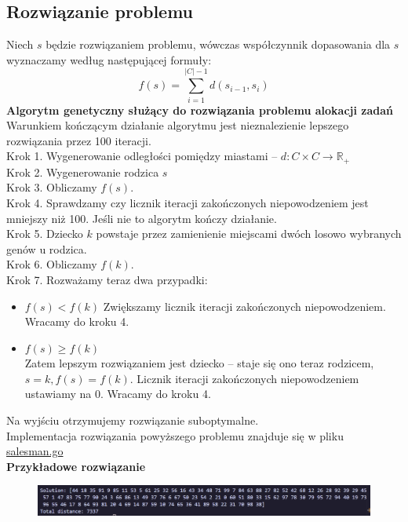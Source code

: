 \documentclass{article}
\begin{document}
    \subsection{Rozwiązanie problemu}
    Niech $s$ będzie rozwiązaniem problemu, wówczas współczynnik dopasowania dla $s$ wyznaczamy według następującej formuły:
    $$f(s)=\sum_{i=1}^{|C|-1}d(s_{i-1},s_i)$$
    \textbf{Algorytm genetyczny służący do rozwiązania problemu alokacji zadań}\\
    Warunkiem kończącym działanie algorytmu jest nieznalezienie lepszego rozwiązania przez 100 iteracji.\\
    Krok 1. Wygenerowanie odległości pomiędzy miastami -- $d:C\times C\rightarrow \mathbb{R_+}$\\
    Krok 2. Wygenerowanie rodzica $s$\\
    Krok 3. Obliczamy $f(s)$.\\
    Krok 4. Sprawdzamy czy licznik iteracji zakończonych niepowodzeniem jest mniejszy niż 100. Jeśli nie to algorytm kończy działanie.\\
    Krok 5. Dziecko $k$ powstaje przez zamienienie miejscami dwóch losowo wybranych genów u rodzica.\\
    Krok 6. Obliczamy $f(k)$.\\
    Krok 7. Rozważamy teraz dwa przypadki:
    \begin{itemize}
    \item $f(s) < f(k)$
        Zwiększamy licznik iteracji zakończonych niepowodzeniem. Wracamy do kroku 4.
    \item $f(s)\geq f(k)$\\
        Zatem lepszym rozwiązaniem jest dziecko -- staje się ono teraz rodzicem, $s=k, f(s)=f(k)$. Licznik iteracji zakończonych niepowodzeniem ustawiamy na 0. Wracamy do kroku 4.
    \end{itemize}
    Na wyjściu otrzymujemy rozwiązanie suboptymalne.\\
    Implementacja rozwiązania powyższego problemu znajduje się w pliku \href{https://github.com/Kaniek99/AIbasics/blob/main/src/salesman/salesman.go}{salesman.go}\\
    \textbf{Przykładowe rozwiązanie}\\
    \begin{figure}[h]
    \includegraphics[width=\linewidth]{salesman_example.png}
    \end{figure}
\end{document}
